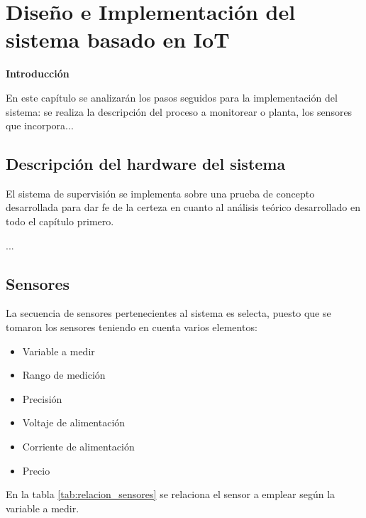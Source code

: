 \chapter{Diseño e Implementación del sistema basado en IoT}\label{cap: }

        \textbf{\Large Introducción}\newline
        
    En este capítulo se analizarán los pasos seguidos para la implementación del sistema: se realiza la descripción del proceso a monitorear o planta, los sensores que incorpora...

\section{Descripción del hardware del sistema}

    El sistema de supervisión se implementa sobre una prueba de concepto desarrollada para dar fe de la certeza en cuanto al análisis teórico desarrollado en todo el capítulo primero.

    ...

\section{Sensores} \label{sec:sensores}

    La secuencia de sensores pertenecientes al sistema es selecta, puesto que se tomaron los sensores teniendo en cuenta varios elementos:

    \begin{itemize}
        \item Variable a medir
        \item Rango de medición
        \item Precisión
        \item Voltaje de alimentación
        \item Corriente de alimentación
        \item Precio
    \end{itemize}

    En la tabla \ref{tab:relacion_sensores} se relaciona el sensor a emplear según la variable a medir.

